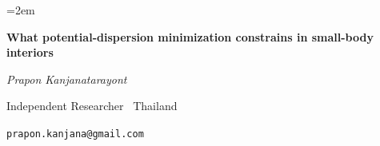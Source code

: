 \documentclass[11pt,a4paper]{article}
\begin{document}
\emergencystretch=2em

\begin{center}
{\LARGE\bfseries What potential-dispersion minimization constrains in
small-body interiors\par}
\vspace{0.8em}
{\itshape Prapon Kanjanatarayont\par}
\vspace{0.2em}
{\small\color{gray} Independent Researcher \textperiodcentered\ Thailand\par}
\vspace{0.1em}
{\small\color{gray} \texttt{prapon.kanjana@gmail.com}\par}
\end{center}
\vspace{1.0em}












\appendix




\end{document}
